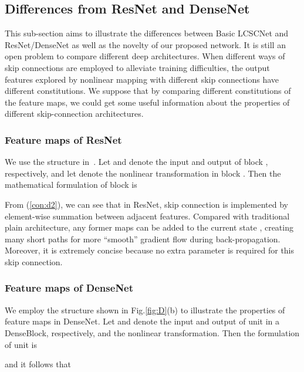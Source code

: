 \documentclass[journal]{IEEEtran}
\begin{document}
\subsection{Differences from ResNet and DenseNet}
This sub-section aims to illustrate the differences between  Basic LCSCNet and ResNet/DenseNet as well as the novelty of our proposed network. It is still an open problem to compare different deep architectures. When different ways of skip connections are employed to alleviate training difficulties, the output features explored by nonlinear mapping with different skip connections have different constitutions. We suppose that by comparing different constitutions of the feature maps, we could get some useful information about the properties of different skip-connection architectures.

\subsubsection{Feature maps of ResNet} 

We use the structure in~\cite{he2016identity}. Let  and  denote the input and output of block , respectively, and let  denote the nonlinear transformation in block . Then the mathematical formulation of block  is

From (\ref{con:d2}), we can see that in ResNet, skip connection is implemented by element-wise summation between adjacent features. Compared with traditional plain architecture, any former maps  can be added to the current state , creating many short paths for more ``smooth'' gradient flow during back-propagation. Moreover, it is extremely concise because no extra parameter is required for this skip connection. 

\subsubsection{Feature maps of DenseNet}

We employ the structure shown in Fig.\ref{fig:D}(b) to illustrate the properties of feature maps in DenseNet. Let  and  denote the input and output of unit  in a DenseBlock, respectively, and  the nonlinear transformation. Then the formulation of unit  is 

and it follows that 
\end{document}
